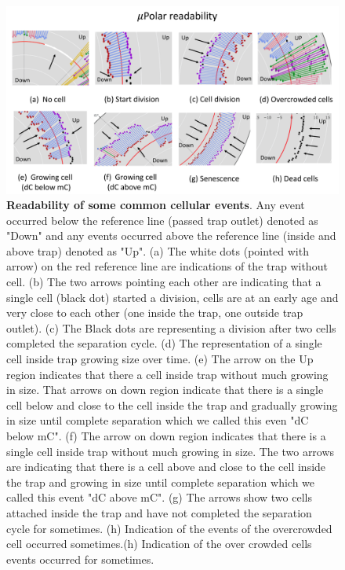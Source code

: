\documentclass[conference]{IEEEtran}
\begin{document}
\begin{figure}
\centering
\includegraphics[width=\textwidth,height=10 cm]{Patterns/read.pdf}
\caption{\textbf{ Readability of some common cellular events}. Any event occurred below the reference line (passed trap outlet) denoted as "Down" and any events occurred above the reference line (inside and above trap) denoted as "Up". (a) The white dots (pointed with arrow) on the red reference line are indications of the trap without cell. (b) The two arrows pointing each other are indicating that a single cell (black dot) started a division, cells are at an early age and very close to each other (one inside the trap, one outside trap outlet). (c) The Black dots are representing a division after two cells completed the separation cycle. (d) The representation of a single cell inside trap growing size over time. (e) The arrow on the Up region indicates that there a cell inside trap without much growing in size. That arrows on down region indicate that there is a single cell below and close to the cell inside the trap and gradually growing in size until complete separation which we called this even "dC below mC". (f) The arrow on down region indicates that there is a single cell inside trap without much growing in size. The two arrows are indicating that there is a cell above and close to the cell inside the trap and growing in size until complete separation which we called this event "dC above mC". (g) The arrows show two cells attached inside the trap and have not completed the separation cycle for sometimes. (h) Indication of the events of the overcrowded cell occurred sometimes.(h) Indication of the over crowded cells events occurred for sometimes.}

\label{fig:read}
\end{figure}
\end{document}
